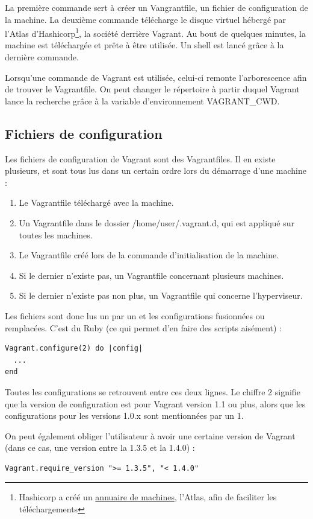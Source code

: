 \documentclass[12pt,a4paper]{article}
\begin{document}
La première commande sert à créer un Vangrantfile, un fichier de configuration de la machine. La deuxième commande télécharge le disque virtuel hébergé par l'Atlas d'Hashicorp\footnote{Hashicorp a créé un \href{https://atlas.hashicorp.com/boxes/search}{annuaire de machines}, l'Atlas, afin de faciliter les téléchargements}, la société derrière Vagrant.
Au bout de quelques minutes, la machine est téléchargée et prête à être utilisée. Un shell est lancé grâce à la dernière commande. 

Lorsqu'une commande de Vagrant est utilisée, celui-ci remonte l'arborescence afin de trouver le Vagrantfile. On peut changer le répertoire à partir duquel Vagrant lance la recherche grâce à la variable d'environnement VAGRANT\_CWD. 

\subsection{Fichiers de configuration}
Les fichiers de configuration de Vagrant sont des Vagrantfiles. Il en existe plusieurs, et sont tous lus dans un certain ordre lors du démarrage d'une machine :
\begin{enumerate}
	\item{Le Vagrantfile téléchargé avec la machine.}
	\item{Un Vagrantfile dans le dossier /home/user/.vagrant.d, qui est appliqué sur toutes les machines.}
	\item{Le Vagrantfile créé lors de la commande d'initialisation de la machine.}
	\item{Si le dernier n'existe pas, un Vagrantfile concernant plusieurs machines.}
	\item{Si le dernier n'existe pas non plus, un Vagrantfile qui concerne l'hyperviseur.}
\end{enumerate}

Les fichiers sont donc lus un par un et les configurations fusionnées ou remplacées. C'est du Ruby (ce qui permet d'en faire des scripts aisément) :
\begin{lstlisting}
Vagrant.configure(2) do |config|
  ...
end
\end{lstlisting}
Toutes les configurations se retrouvent entre ces deux lignes. Le chiffre 2 signifie que la version de configuration est pour Vagrant version 1.1 ou plus, alors que les configurations pour les versions 1.0.x sont mentionnées par un 1.

On peut également obliger l'utilisateur à avoir une certaine version de Vagrant (dans ce cas, une version entre la 1.3.5 et la 1.4.0) :
\begin{lstlisting}
Vagrant.require_version ">= 1.3.5", "< 1.4.0"
\end{lstlisting}
\end{document}
